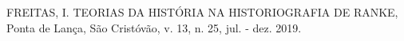 \documentclass[
12pt,		%
openright,	%
twoside,  %
a4paper,			%
chapter=TITLE,		%
english,			%
french,				%
spanish,			%
brazil				%
]{USPSC-classe/USPSC}
\begin{document}
\begin{flushleft}
\begin{flushleft}
\begin{flushleft}
\begin{flushleft}
\begin{flushleft}
\begin{flushleft}
\begin{flushleft}
\begin{flushleft}
\begin{flushleft}
\begin{flushleft}
[FREITAS, 2019] FREITAS, I. TEORIAS DA HIST\'ORIA NA HISTORIOGRAFIA DE RANKE, Ponta de Lan\c{c}a, S\~ao Crist\'ov\~ao, v. 13, n. 25, jul. - dez. 2019.
\end{flushleft}


\end{flushleft}


\end{flushleft}


\end{flushleft}


\end{flushleft}


\end{flushleft}


\end{flushleft}


\end{flushleft}


\end{flushleft}


\end{flushleft}
\end{document}
